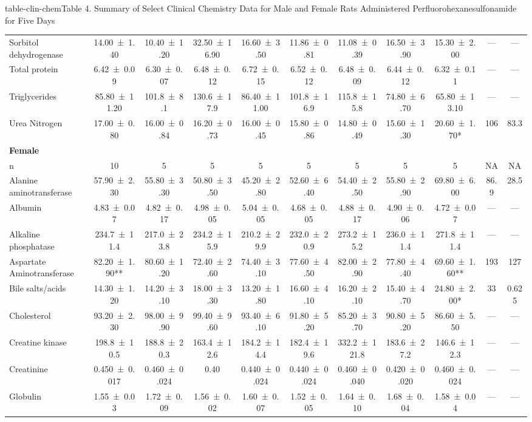 \begin{landscape}
\begin{niehstable}{table-clin-chem}{Table 4. Summary of Select Clinical Chemistry Data for Male and Female Rats Administered Perfluorohexanesulfonamide for Five Days}
\begin{tabular}{lcccccccccc}
Sorbitol dehydrogenase & 14.00 ± 1.40 & 10.40 ± 1.20 & 32.50 ± 16.90 & 16.60 ± 3.50 & 11.86 ± 0.81 & 11.08 ± 0.39 & 16.50 ± 3.90 & 15.30 ± 2.00 & — & — \\
Total protein & 6.42 ± 0.09 & 6.30 ± 0.07 & 6.48 ± 0.12 & 6.72 ± 0.15 & 6.52 ± 0.12 & 6.48 ± 0.09 & 6.44 ± 0.12 & 6.32 ± 0.11 & — & — \\
Triglycerides & 85.80 ± 11.20 & 101.8 ± 8.1 & 130.6 ± 17.9 & 86.40 ± 11.00 & 101.8 ± 16.9 & 115.8 ± 15.8 & 74.80 ± 6.70 & 65.80 ± 13.10 & — & — \\
Urea Nitrogen & 17.00 ± 0.80 & 16.00 ± 0.84 & 16.20 ± 0.73 & 16.00 ± 0.45 & 15.80 ± 0.86 & 14.80 ± 0.49 & 15.60 ± 1.30 & 20.60 ± 1.70* & 106 & 83.3 \\
\multicolumn{11}{l}{\textbf{Female}} \\
n & 10 & 5 & 5 & 5 & 5 & 5 & 5 & 5 & NA & NA \\
Alanine aminotransferase & 57.90 ± 2.30 & 55.80 ± 3.30 & 50.80 ± 3.50 & 45.20 ± 2.80 & 52.60 ± 6.40 & 54.40 ± 2.50 & 55.80 ± 2.90 & 69.80 ± 6.00 & 86.9 & 28.5 \\
Albumin & 4.83 ± 0.07 & 4.82 ± 0.17 & 4.98 ± 0.05 & 5.04 ± 0.05 & 4.68 ± 0.05 & 4.88 ± 0.17 & 4.90 ± 0.06 & 4.72 ± 0.07 & — & — \\
Alkaline phosphatase & 234.7 ± 11.4 & 217.0 ± 23.8 & 234.2 ± 15.9 & 210.2 ± 29.9 & 232.0 ± 20.9 & 273.2 ± 15.2 & 236.0 ± 11.4 & 271.8 ± 11.4 & — & — \\
Aspartate Aminotransferase & 82.20 ± 1.90** & 80.60 ± 1.20 & 72.40 ± 2.60 & 74.40 ± 3.10 & 77.60 ± 4.50 & 82.00 ± 2.90 & 77.80 ± 4.40 & 69.60 ± 1.60** & 193 & 127 \\
Bile salts/acids & 14.30 ± 1.20 & 14.20 ± 3.10 & 18.00 ± 3.30 & 13.20 ± 1.80 & 16.60 ± 4.10 & 16.20 ± 2.10 & 15.40 ± 4.70 & 24.80 ± 2.00* & 33 & 0.625 \\
Cholesterol & 93.20 ± 2.30 & 98.00 ± 9.90 & 99.40 ± 9.60 & 93.40 ± 6.10 & 91.80 ± 5.20 & 85.20 ± 3.70 & 90.80 ± 5.20 & 86.60 ± 5.50 & — & — \\
Creatine kinase & 198.8 ± 10.5 & 188.8 ± 20.3 & 163.4 ± 12.6 & 184.2 ± 14.4 & 182.4 ± 19.6 & 332.2 ± 121.8 & 183.6 ± 27.2 & 146.6 ± 12.3 & — & — \\
Creatinine & 0.450 ± 0.017 & 0.460 ± 0.024 & 0.40 & 0.440 ± 0.024 & 0.440 ± 0.024 & 0.460 ± 0.040 & 0.420 ± 0.020 & 0.460 ± 0.024 & — & — \\
Globulin & 1.55 ± 0.03 & 1.72 ± 0.09 & 1.56 ± 0.02 & 1.60 ± 0.07 & 1.52 ± 0.05 & 1.64 ± 0.10 & 1.68 ± 0.04 & 1.58 ± 0.04 & — & — \\

\end{tabular}
\end{niehstable}
\end{landscape}
